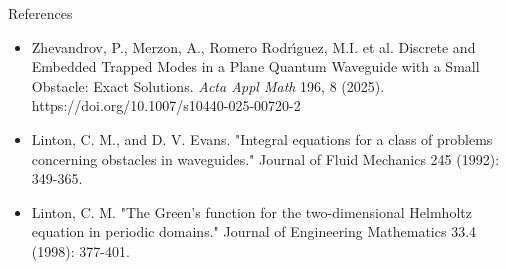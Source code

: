 \documentclass{beamer}
\begin{document}
\begin{frame}{References}
  \begin{itemize}
  \item Zhevandrov, P., Merzon, A., Romero Rodr\'\i guez, M.I. et al. Discrete and Embedded Trapped Modes in a Plane Quantum Waveguide with a Small Obstacle: Exact Solutions. {\it Acta Appl Math} 196, 8 (2025). https://doi.org/10.1007/s10440-025-00720-2

  \item Linton, C. M., and D. V. Evans. "Integral equations for a class of problems concerning obstacles in waveguides." Journal of Fluid Mechanics 245 (1992): 349-365.

  \item Linton, C. M. "The Green's function for the two-dimensional Helmholtz equation in periodic domains." Journal of Engineering Mathematics 33.4 (1998): 377-401.
    
  \end{itemize}


















\end{frame}
\end{document}
